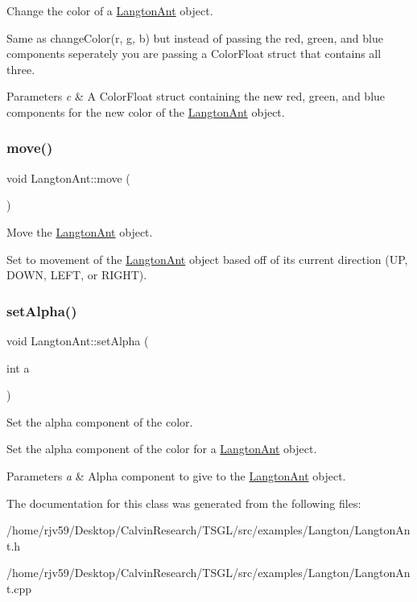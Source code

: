 Change the color of a \hyperlink{class_langton_ant}{Langton\+Ant} object. 

Same as change\+Color(r, g, b) but instead of passing the red, green, and blue components seperately you are passing a Color\+Float struct that contains all three. 
\begin{DoxyParams}{Parameters}
{\em c} & A Color\+Float struct containing the new red, green, and blue components for the new color of the \hyperlink{class_langton_ant}{Langton\+Ant} object. \\
\hline
\end{DoxyParams}
\mbox{\label{class_langton_ant_acf17f14d78270a32b66273d83d8900c1}} 
\subsubsection{\texorpdfstring{move()}{move()}}
{\footnotesize\ttfamily void Langton\+Ant\+::move (\begin{DoxyParamCaption}{ }\end{DoxyParamCaption})}



Move the \hyperlink{class_langton_ant}{Langton\+Ant} object. 

Set to movement of the \hyperlink{class_langton_ant}{Langton\+Ant} object based off of its current direction (UP, D\+O\+WN, L\+E\+FT, or R\+I\+G\+HT). \mbox{\label{class_langton_ant_a5fd5b25e776cfe96abe70300d022e333}} 
\subsubsection{\texorpdfstring{set\+Alpha()}{setAlpha()}}
{\footnotesize\ttfamily void Langton\+Ant\+::set\+Alpha (\begin{DoxyParamCaption}\item[{int}]{a }\end{DoxyParamCaption})}



Set the alpha component of the color. 

Set the alpha component of the color for a \hyperlink{class_langton_ant}{Langton\+Ant} object. 
\begin{DoxyParams}{Parameters}
{\em a} & Alpha component to give to the \hyperlink{class_langton_ant}{Langton\+Ant} object. \\
\hline
\end{DoxyParams}


The documentation for this class was generated from the following files\+:\begin{DoxyCompactItemize}
\item 
/home/rjv59/\+Desktop/\+Calvin\+Research/\+T\+S\+G\+L/src/examples/\+Langton/Langton\+Ant.\+h\item 
/home/rjv59/\+Desktop/\+Calvin\+Research/\+T\+S\+G\+L/src/examples/\+Langton/Langton\+Ant.\+cpp\end{DoxyCompactItemize}
